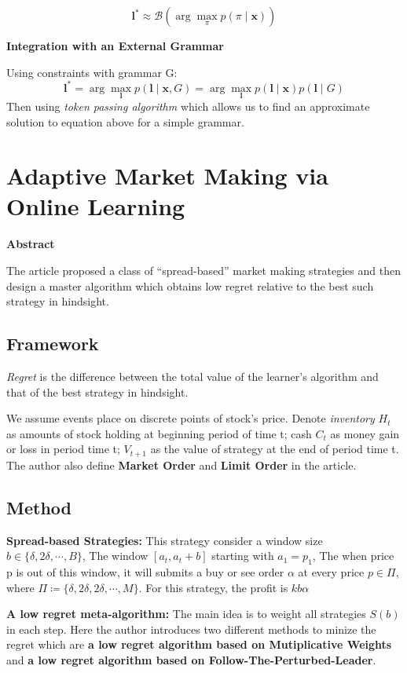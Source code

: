 \documentclass[letterpaper]{article}
\begin{document}
\begin{spacing}{1.1}
$$
\textbf{l}^* \approx \mathcal{B}(\arg\max_\pi p(\pi \mid \textbf{x}))
$$

\textbf{Integration with an External Grammar}

Using constraints with grammar G:
$$
\textbf{l}^* = \arg\max_{\textbf{l}} p(\textbf{l} \mid \textbf{x},G) = \arg\max_{\textbf{l}} p(\textbf{l} \mid \textbf{x})p(\textbf{l} \mid G)
$$
Then using \emph{token passing algorithm} which allows us to find an approximate solution to equation above for a simple grammar.

\section{Adaptive Market Making via Online Learning}
\begin{center}
\textbf{Abstract}
\end{center}
The article proposed a class of ``spread-based'' market making strategies and then design a master algorithm which obtains low regret relative to the best such strategy in hindsight.

\subsection*{Framework}
\emph{Regret} is the difference between the total value of the learner's algorithm and that of the best strategy in hindsight.

We assume events place on discrete points of stock's price. Denote \emph{inventory} $H_t$ as amounts of stock holding at beginning period of time t; cash $C_t$ as money gain or loss in period time t; $V_{t+1}$ as the value of strategy at the end of period time t. The author also define \textbf{Market Order} and \textbf{Limit Order} in the article.

\subsection*{Method}
\textbf{Spread-based Strategies:} This strategy consider a window size $b \in \{\delta,2\delta,\cdots,B\}$, The window $[a_t,a_t+b]$ starting with $a_1 = p_1$, The when price p is out of this window, it will submits a buy or see order $\alpha$ at every price $p \in \Pi$, where $\Pi \coloneqq \{\delta,2\delta,2\delta,\cdots,M\}$. For this strategy, the profit is $kb\alpha$

\textbf{A low regret meta-algorithm:} The main idea is to weight all strategies $S(b)$ in each step. Here the author introduces two different methods to minize the regret which are \textbf{a low regret algorithm based on Mutiplicative Weights} and \textbf{a low regret algorithm based on Follow-The-Perturbed-Leader}.


\end{spacing}
\end{document}
